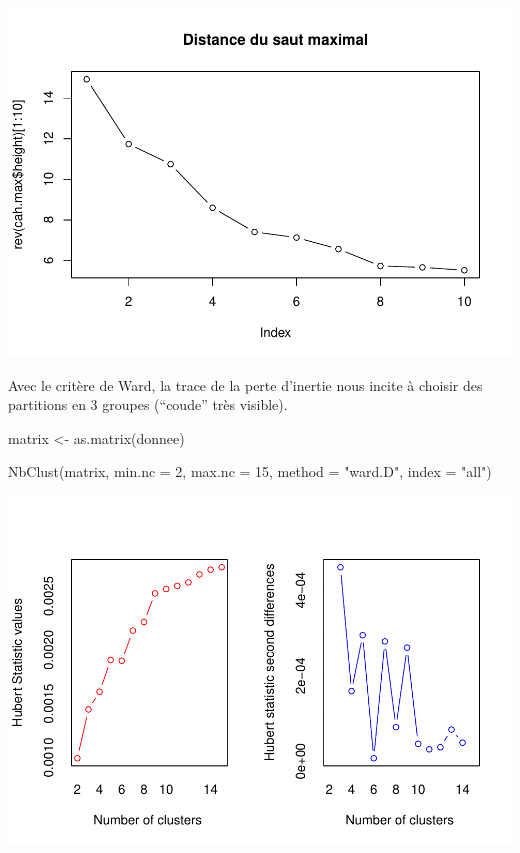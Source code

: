 \documentclass[
]{article}
\newenvironment{Shaded}{}{}
\newcommand{\AttributeTok}[1]{#1}
\newcommand{\DecValTok}[1]{#1}
\newcommand{\FunctionTok}[1]{#1}
\newcommand{\NormalTok}[1]{#1}
\newcommand{\OtherTok}[1]{\textcolor[rgb]{1.00,0.25,0.00}{#1}}
\newcommand{\StringTok}[1]{\textcolor[rgb]{0.00,0.50,0.50}{#1}}
\begin{document}
\includegraphics{Projet_files/figure-latex/unnamed-chunk-16-1.pdf}

Avec le critère de Ward, la trace de la perte d'inertie nous incite à
choisir des partitions en 3 groupes (``coude'' très visible).

\begin{Shaded}
\begin{Highlighting}[]
\NormalTok{matrix }\OtherTok{\textless{}{-}} \FunctionTok{as.matrix}\NormalTok{(donnee)}
\end{Highlighting}
\end{Shaded}

\begin{Shaded}
\begin{Highlighting}[]
\FunctionTok{NbClust}\NormalTok{(matrix, }\AttributeTok{min.nc =} \DecValTok{2}\NormalTok{, }\AttributeTok{max.nc =} \DecValTok{15}\NormalTok{, }\AttributeTok{method =} \StringTok{"ward.D"}\NormalTok{, }\AttributeTok{index =} \StringTok{"all"}\NormalTok{)}
\end{Highlighting}
\end{Shaded}

\includegraphics{Projet_files/figure-latex/unnamed-chunk-18-1.pdf}
\end{document}

